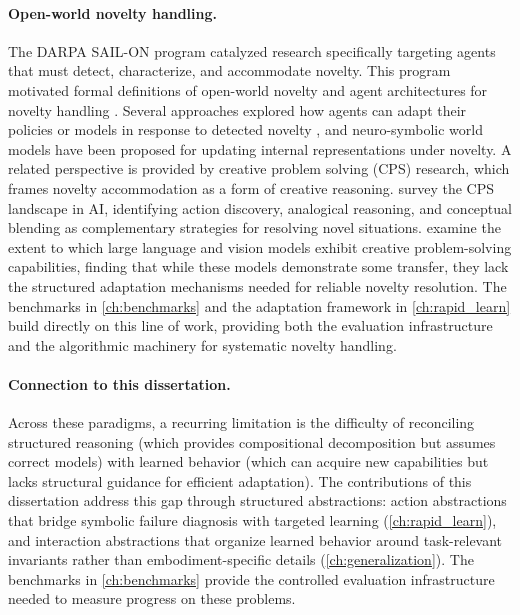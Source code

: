 \paragraph{Open-world novelty handling.}
The DARPA SAIL-ON program \citep{senator2019science} catalyzed research specifically targeting agents that must detect, characterize, and accommodate novelty. This program motivated formal definitions of open-world novelty \citep{boult2021towards, langley2020open} and agent architectures for novelty handling \citep{muhammad2021novelty, goel2024neurosymbolic}. Several approaches explored how agents can adapt their policies or models in response to detected novelty \citep{balloch2022novgrid, balloch2023neuro}, and neuro-symbolic world models have been proposed for updating internal representations under novelty. A related perspective is provided by creative problem solving (CPS) research, which frames novelty accommodation as a form of creative reasoning. \citet{gizzi2022cps} survey the CPS landscape in AI, identifying action discovery, analogical reasoning, and conceptual blending as complementary strategies for resolving novel situations. \citet{nair2024cps} examine the extent to which large language and vision models exhibit creative problem-solving capabilities, finding that while these models demonstrate some transfer, they lack the structured adaptation mechanisms needed for reliable novelty resolution. The benchmarks in \cref{ch:benchmarks} and the adaptation framework in \cref{ch:rapid_learn} build directly on this line of work, providing both the evaluation infrastructure and the algorithmic machinery for systematic novelty handling.

\paragraph{Connection to this dissertation.}
Across these paradigms, a recurring limitation is the difficulty of reconciling structured reasoning (which provides compositional decomposition but assumes correct models) with learned behavior (which can acquire new capabilities but lacks structural guidance for efficient adaptation). The contributions of this dissertation address this gap through structured abstractions: action abstractions that bridge symbolic failure diagnosis with targeted learning (\cref{ch:rapid_learn}), and interaction abstractions that organize learned behavior around task-relevant invariants rather than embodiment-specific details (\cref{ch:generalization}). The benchmarks in \cref{ch:benchmarks} provide the controlled evaluation infrastructure needed to measure progress on these problems.